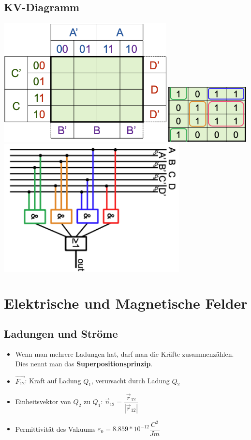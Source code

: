 \documentclass[8pt,a4paper]{scrartcl}
\begin{document}
\begin{multicols*}{3}
			\subsection{KV-Diagramm}
				\includegraphics[height=6.5cm]{img/kv1.png} 
				\includegraphics[height=3cm]{img/kv2.png} 
				\includegraphics[height=7cm]{img/kv3.png} 


		\section{Elektrische und Magnetische Felder}

			\subsection{Ladungen und Ströme}
				\begin{itemize}\itemsep0pt
					\item Wenn man mehrere Ladungen hat, darf man die Kräfte zusammenzählen. Dies nennt man das \textbf{Superpositionsprinzip}.
					\item $\overrightarrow{F_{12}}$: Kraft auf Ladung $Q_{1}$, verursacht durch Ladung $Q_{2}$
					\item Einheitsvektor von $Q_{2}$ zu $Q_{1}$: $\overrightarrow{n}_{12} = \dfrac{\overrightarrow{r}_{12}}{|\overrightarrow{r}_{12}|}$
					\item Permittivität des Vakuums $ \varepsilon_{0}=8.859*10^{-12}\dfrac{C^{2}}{Jm}$
				\end{itemize}
			

\end{multicols*}
\end{document}
